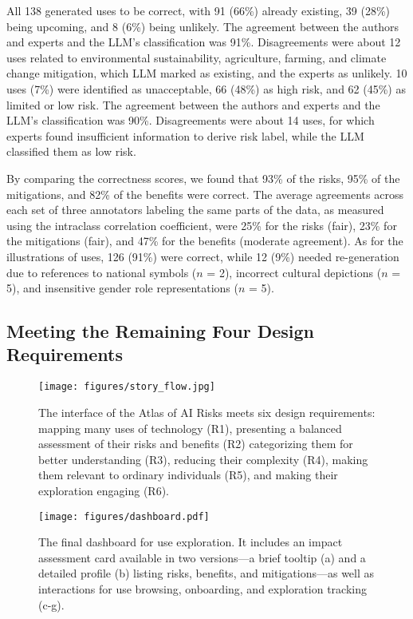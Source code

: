 All 138 generated uses to be correct, with 91 (66\%) already existing, 39 (28\%) being upcoming, and 8 (6\%) being unlikely. The agreement between the authors and experts and the LLM's classification was 91\%. Disagreements were about 12 uses related to environmental sustainability, agriculture, farming, and climate change mitigation, which LLM marked as existing, and the experts as unlikely. 10 uses (7\%) were identified as unacceptable, 66 (48\%) as high risk, and 62 (45\%) as limited or low risk. The agreement between the authors and experts and the LLM's classification was 90\%. Disagreements were about 14 uses, for which experts found insufficient information to derive risk label, while the LLM classified them as low risk.

By comparing the correctness scores, we found that 93\% of the risks, 95\% of the mitigations, and 82\% of the benefits were correct. The average agreements across each set of three annotators labeling the same parts of the data, as measured using the intraclass correlation coefficient, were 25\% for the risks (fair), 23\% for the mitigations (fair), and 47\% for the benefits (moderate agreement). As for the illustrations of uses, 126 (91\%) were correct, while 12 (9\%) needed re-generation due to references to national symbols ($n$ = 2), incorrect cultural depictions ($n$ = 5), and insensitive gender role representations ($n$ = 5).

\subsection{Meeting the Remaining Four Design Requirements}
\label{sec:design}

\begin{figure*}[t!]
  \centering
\texttt{[image: figures/story\_flow.jpg]}
  \caption{The interface of the Atlas of AI Risks meets six design requirements: mapping many uses of technology (R1), presenting a balanced assessment of their risks and benefits (R2) categorizing them for better understanding (R3), reducing their complexity (R4), making them relevant to ordinary individuals (R5), and making their exploration engaging (R6).}
  \label{fig:atlas}
\end{figure*}

\begin{figure}[t!]
\texttt{[image: figures/dashboard.pdf]}
  \caption{The final dashboard for use exploration. It includes an impact assessment card available in two versions—a brief tooltip (a) and a detailed profile (b) listing risks, benefits, and mitigations—as well as interactions for use browsing, onboarding, and exploration tracking (c-g).}
  \label{fig:dashboard}
\end{figure}

